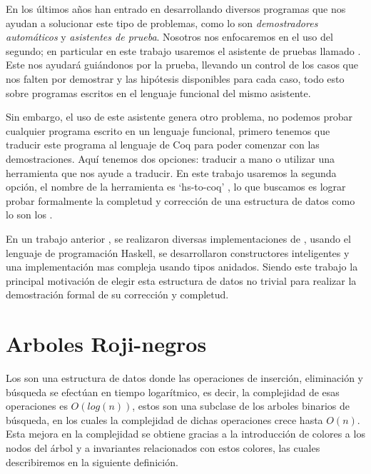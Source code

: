 En los últimos años han entrado en desarrollando diversos programas que nos ayudan a solucionar
este tipo de problemas, como lo son \textit{demostradores autom\'aticos} y \textit{asistentes de
prueba}. Nosotros nos enfocaremos en el uso del segundo; en particular en este trabajo usaremos el
asistente de pruebas llamado {\coq}. Este nos ayudar\'a gui\'andonos por la prueba, llevando un
control de los casos que nos falten por demostrar y las hip\'otesis disponibles para cada caso,
todo esto sobre programas escritos en el lenguaje funcional del mismo asistente.

Sin embargo, el uso de este asistente genera otro problema, no podemos probar cualquier programa
escrito en un lenguaje funcional, primero tenemos que traducir este programa al lenguaje de Coq
para poder comenzar con las demostraciones. Aquí tenemos dos opciones: traducir a mano o utilizar
una herramienta que nos ayude a traducir. En este trabajo usaremos la segunda opci\'on, el nombre
de la herramienta es `hs-to-coq' \cite{thrc}, lo que buscamos es lograr probar formalmente la
completud y correcci\'on de una estructura de datos como lo son los {\arns}.

En un trabajo anterior \cite{tesisG}, se realizaron diversas implementaciones de {\arns}, usando el
lenguaje de programaci\'on Haskell, se desarrollaron constructores inteligentes y una
implementaci\'on mas compleja usando tipos anidados. Siendo este trabajo la principal motivaci\'on
de elegir esta estructura de datos no trivial para realizar la demostraci\'on formal de su
corrección y completud.

\section{Arboles Roji-negros}
Los {\arns} son una estructura de datos donde las operaciones de inserci\'on, eliminaci\'on y
búsqueda se efectúan en tiempo logarítmico, es decir, la complejidad de esas operaciones es
$O(log(n))$, estos son una subclase de los arboles binarios de búsqueda, en los cuales la
complejidad de dichas operaciones crece hasta $O(n)$. Esta mejora en la complejidad se obtiene
gracias a la introducción de colores a los nodos del \'arbol y a invariantes relacionados con estos
colores, las cuales describiremos en la siguiente definici\'on.

